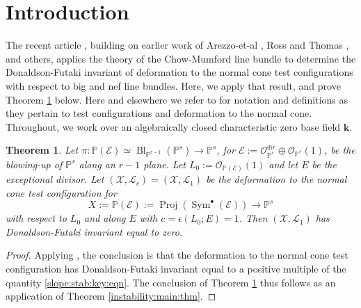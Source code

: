 \documentclass[10pt,letterpaper]{amsart}
\newcommand{\Osh}{{\mathcal O}}                        %
\newcommand{\kk}{\mathbf{k}}
\newcommand{\PP}{\mathbb{P}} %
\newtheorem{theorem}{Theorem}[section]
\theoremstyle{definition}
\numberwithin{equation}{section}
\begin{document}
\maketitle


\section{Introduction}

The recent article \cite{Grieve:CM:Line:Slope:Stab}, building on earlier work of Arezzo-et-al \cite{Arezzo:DellaVedova:LaNave}, Ross and Thomas \cite{Ross:Thomas:2007}, \cite{Ross:Thomas:2006} and others, applies the theory of the Chow-Mumford line bundle to determine the Donaldson-Futaki invariant of deformation to the normal cone test configurations with respect to big and nef line bundles.  Here, we apply that result, \cite[Theorem 1.1]{Grieve:CM:Line:Slope:Stab} and prove Theorem \ref{big:and:nef:blow:up:PP:n} below.  Here and elsewhere we refer to \cite{Grieve:CM:Line:Slope:Stab} for notation and definitions as they pertain to test configurations and deformation to the normal cone.  Throughout, we work over an algebraically closed characteristic zero base field $\kk$.

\begin{theorem}\label{big:and:nef:blow:up:PP:n}  
Let  $\pi \colon \PP(\mathcal{E}) \simeq \operatorname{Bl}_{\PP^{r-1}}(\PP^s) \rightarrow \PP^s$, for $\mathcal{E} := \Osh_{\PP^s}^{\oplus r} \oplus \Osh_{\PP^s}(1)$, be the blowing-up of $\PP^s$ along an $r-1$ plane.  Let $L_0 := \Osh_{\PP(\mathcal{E})}(1)$ and let $E$ be the exceptional divisor.  Let $(\mathcal{X},\mathcal{L}_c)=(\mathcal{X},\mathcal{L}_1)$ be the deformation to the normal cone test configuration for 
$$X := \PP(\mathcal{E}) := \operatorname{Proj} \left(\operatorname{Sym}^\bullet (\mathcal{E}) \right) \rightarrow \PP^s$$ 
with respect to $L_0$ and along $E$ with $c = \epsilon(L_0;E) = 1$.  Then $(\mathcal{X},\mathcal{L}_1)$ has Donaldson-Futaki invariant equal to zero.
\end{theorem}
\begin{proof}
Applying \cite[Theorem 1.1]{Grieve:CM:Line:Slope:Stab}, the conclusion is that the deformation to the normal cone test configuration has Donaldson-Futaki invariant equal to a positive multiple of the quantity \eqref{slope:stab:key:eqn}.  The conclusion of Theorem \ref{big:and:nef:blow:up:PP:n} thus follows as an application of Theorem \ref{instability:main:thm}.
\end{proof}
\end{document}
